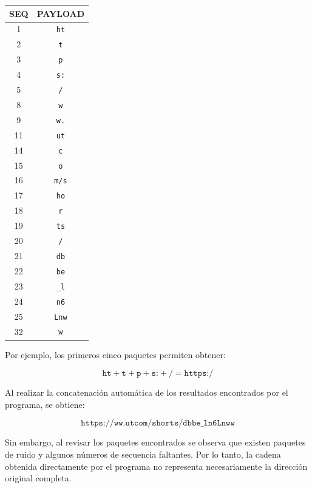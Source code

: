 \documentclass[11pt,a4paper]{article}
\begin{document}
\begin{enumerate}[label=\arabic*)]
\begin{enumerate}[label=\alph*)]
  \begin{center}

    \begin{tabular}{|c|c|}
      \hline
      SEQ & PAYLOAD \\
      \hline
      1 & \texttt{ht} \\
      \hline
      2 & \texttt{t} \\
      \hline
      3 & \texttt{p} \\
      \hline
      4 & \texttt{s:} \\
      \hline
      5 & \texttt{/} \\
      \hline
      8 & \texttt{w} \\
      \hline
      9 & \texttt{w.} \\
      \hline
      11 & \texttt{ut} \\
      \hline
      14 & \texttt{c} \\
      \hline
      15 & \texttt{o} \\
      \hline
      16 & \texttt{m/s} \\
      \hline
      17 & \texttt{ho} \\
      \hline
      18 & \texttt{r} \\
      \hline
      19 & \texttt{ts} \\
      \hline
      20 & \texttt{/} \\
      \hline
      21 & \texttt{db} \\
      \hline
      22 & \texttt{be} \\
      \hline
      23 & \texttt{\_l} \\
      \hline
      24 & \texttt{n6} \\
      \hline
      25 & \texttt{Lnw} \\
      \hline
      32 & \texttt{w} \\
      \hline
    \end{tabular}

  \end{center}

  Por ejemplo, los primeros cinco paquetes permiten obtener:

  \[
    \texttt{ht}+\texttt{t}+\texttt{p}+\texttt{s:}+\texttt{/}
    =
    \texttt{https:/}
  \]

  Al realizar la concatenación automática de los resultados encontrados
  por el programa, se obtiene:

  \[
    \boxed{\texttt{https://ww.utcom/shorts/dbbe\_ln6Lnww}}
  \]

  Sin embargo, al revisar los paquetes encontrados se observa que
  existen paquetes de ruido y algunos números de secuencia faltantes.
  Por lo tanto, la cadena obtenida directamente por el programa no
  representa necesariamente la dirección original completa.


\end{enumerate}
\end{enumerate}
\end{document}
